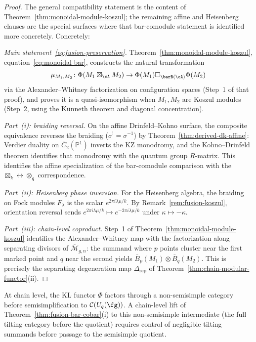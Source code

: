 \begin{proof}
The general compatibility statement is the content of
Theorem~\ref{thm:monoidal-module-koszul}; the remaining affine and
Heisenberg clauses are the special surfaces where that bar-comodule
statement is identified more concretely. Concretely:

\emph{Main statement~\eqref{eq:fusion-preservation}.}\quad
Theorem~\ref{thm:monoidal-module-koszul},
equation~\eqref{eq:monoidal-bar}, constructs the natural transformation
\[
\mu_{M_1, M_2}\colon \Phi(M_1 \boxtimes_\cA M_2) \to
\Phi(M_1) \square_{\barB(\cA)} \Phi(M_2)
\]
via the Alexander--Whitney factorization on configuration spaces
(Step~1 of that proof), and proves it is a quasi-isomorphism when
$M_1, M_2$ are Koszul modules (Step~2, using the K\"unneth theorem
and diagonal concentration).

\emph{Part~(i): braiding reversal.}\quad
On the affine Drinfeld--Kohno surface, the composite equivalence
reverses the braiding ($\sigma^! = \sigma^{-1}$) by
Theorem~\ref{thm:derived-dk-affine}: Verdier duality on
$\overline{C}_2(\mathbb{P}^1)$ inverts the KZ monodromy, and the
Kohno--Drinfeld theorem identifies that monodromy with the quantum
group $R$-matrix. This identifies the affine specialization of the
bar-comodule comparison with the
$\boxtimes_k \leftrightarrow \otimes_q$ correspondence.

\emph{Part~(ii): Heisenberg phase inversion.}\quad
For the Heisenberg algebra, the braiding on Fock modules $F_\lambda$ is
the scalar $e^{2\pi i\lambda\mu/k}$. By
Remark~\ref{rem:fusion-koszul}, orientation reversal sends
$e^{2\pi i\lambda\mu/k} \mapsto e^{-2\pi i\lambda\mu/k}$
under $\kappa \mapsto -\kappa$.

\emph{Part~(iii): chain-level coproduct.}\quad
Step~1 of Theorem~\ref{thm:monoidal-module-koszul} identifies the
Alexander--Whitney map with the factorization along separating
divisors of $\overline{\mathcal{M}}_{g,n}$: the summand where $p$
points cluster near the first marked point and $q$ near the second
yields $\bar{B}_p(M_1) \otimes \bar{B}_q(M_2)$. This is
precisely the separating degeneration map $\Delta_{\mathrm{sep}}$ of
Theorem~\ref{thm:chain-modular-functor}(ii).
\end{proof}

\begin{remark}\label{rem:fusion-nonsemisimple}
At chain level, the KL functor $\Phi$ factors through
a non-semisimple category before semisimplification to
$\mathcal{C}(U_q(\fg))$. A chain-level lift of
Theorem~\ref{thm:fusion-bar-cobar}(i) to this non-semisimple
intermediate (the full tilting category before the quotient)
requires control of negligible tilting summands before passage
to the semisimple quotient.
\end{remark}

